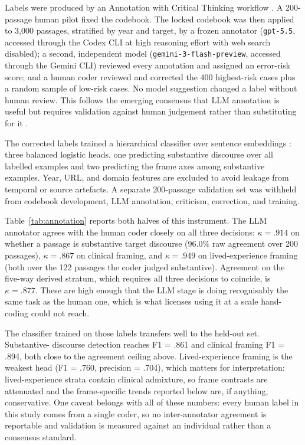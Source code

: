 \documentclass[final]{clv2025}
\begin{document}
Labels were produced by an Annotation with Critical Thinking workflow
\citep{linACTHumanMultimodal2025}. A 200-passage human pilot fixed the codebook. The locked
codebook was then applied to 3{,}000 passages, stratified by year and target, by a frozen
annotator (\texttt{gpt-5.5}, accessed through the Codex CLI at high reasoning effort with
web search disabled); a second, independent model (\texttt{gemini-3-flash-preview}, accessed
through the Gemini CLI) reviewed every annotation and assigned an error-risk score; and a
human coder reviewed and corrected the 400 highest-risk cases plus a random sample of
low-risk cases. No model suggestion changed a label without human
review. This follows the emerging consensus that LLM annotation is useful but requires
validation against human judgement rather than substituting for it
\citep{gilardiChatGPT2023,pangakisValidation2023,ziems-etal-2024-large}.

The corrected labels trained a hierarchical classifier over sentence embeddings
\citep{songMPNet2020}: three balanced logistic heads, one predicting substantive discourse
over all labelled examples and two predicting the frame axes among substantive examples.
Year, URL, and domain features are excluded to avoid leakage from temporal or source
artefacts. A separate 200-passage validation set was withheld from codebook development,
LLM annotation, criticism, correction, and training.



Table~\ref{tab:annotation} reports both halves of this instrument. The LLM annotator
agrees with the human coder closely on all three decisions: $\kappa = .914$ on whether a
passage is substantive target discourse (96.0\% raw agreement over 200 passages),
$\kappa = .867$ on clinical framing, and $\kappa = .949$ on lived-experience framing
(both over the 122 passages the coder judged substantive). Agreement on the five-way
derived stratum, which requires all three decisions to coincide, is $\kappa = .877$. These
are high enough that the LLM stage is doing recognisably the same task as the human
one, which is what licenses using it at a scale hand-coding could not reach.

The classifier trained on those labels transfers well to the held-out set. Substantive-
discourse detection reaches F1 = .861 and clinical framing F1 = .894, both close to the
agreement ceiling above. Lived-experience framing is the weakest head (F1 = .760,
precision = .704), which matters for interpretation: lived-experience strata contain
clinical admixture, so frame contrasts are attenuated and the frame-specific trends
reported below are, if anything, conservative. One caveat belongs with all of these
numbers: every human label in this study comes from a single coder, so no inter-annotator
agreement is reportable and validation is measured against an individual rather than a
consensus standard.
\end{document}
